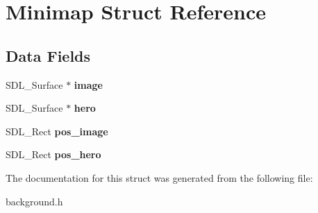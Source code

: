 \hypertarget{structMinimap}{}\section{Minimap Struct Reference}
\label{structMinimap}
\subsection*{Data Fields}
\begin{DoxyCompactItemize}
\item 
\mbox{\label{structMinimap_ae1792d7a5459227ec30b7c1e84a586fc}} 
S\+D\+L\+\_\+\+Surface $\ast$ {\bfseries image}
\item 
\mbox{\label{structMinimap_a8ed3ce99bcaf1dfc85548642abe7b8c7}} 
S\+D\+L\+\_\+\+Surface $\ast$ {\bfseries hero}
\item 
\mbox{\label{structMinimap_a36d34abc386e8bae78f7adf4c43e6f0d}} 
S\+D\+L\+\_\+\+Rect {\bfseries pos\+\_\+image}
\item 
\mbox{\label{structMinimap_a6b55710065e1c7b804d48fa8087f8824}} 
S\+D\+L\+\_\+\+Rect {\bfseries pos\+\_\+hero}
\end{DoxyCompactItemize}


The documentation for this struct was generated from the following file\+:\begin{DoxyCompactItemize}
\item 
background.\+h\end{DoxyCompactItemize}

